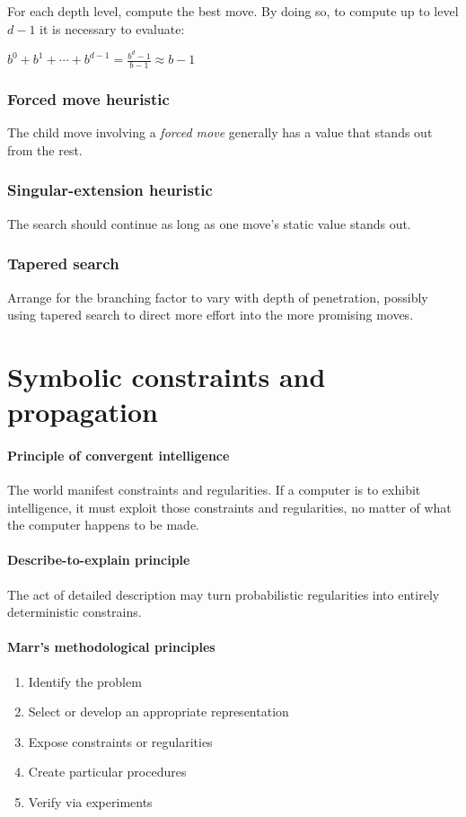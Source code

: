 \documentclass{article}
\begin{document}
For each depth level, compute the best move. By doing so, to compute up to level $d-1$ it is necessary to
evaluate:

\begin{math}
  b^0 + b^1 + \cdots + b^{d-1} = \frac{b^d-1}{b-1} \approx b-1
\end{math}

\subsubsection{Forced move heuristic}

The child move involving a \textit{forced move} generally has a
value that stands out from the rest.

\subsubsection{Singular-extension heuristic}

The search should continue as long as one move's static value
stands out.

\subsubsection{Tapered search}

Arrange for the branching factor to vary with depth of
penetration, possibly using tapered search to direct more effort
into the more promising moves.

\section{Symbolic constraints and propagation}

\paragraph{Principle of convergent intelligence} The world
manifest constraints and regularities. If a computer is to
exhibit intelligence, it must exploit those constraints and
regularities, no matter of what the computer happens to be made.

\paragraph{Describe-to-explain principle} The act of detailed
description may turn probabilistic regularities into entirely
deterministic constrains.

\paragraph{Marr's methodological principles}
\begin{enumerate}
  \item Identify the problem
  \item Select or develop an appropriate representation
  \item Expose constraints or regularities
  \item Create particular procedures 
  \item Verify via experiments
\end{enumerate}
\end{document}
